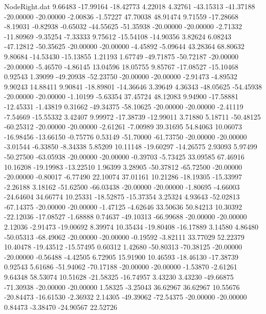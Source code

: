 \begin{filecontents}{NodeRight.dat}
   9.66483  -17.99164  -18.42773     4.22018    4.32761  -43.15313  -41.37188  -20.00000  -20.00000   -2.00836   -1.57227   47.70038   48.91474
   9.71559  -17.28668   -8.19031    -0.82938   -0.65032  -44.55625  -51.35938  -20.00000  -20.00000   -2.71332  -11.80969   -9.35254   -7.33333
   9.75612  -15.54108  -14.90356     3.82624    6.08243  -47.12812  -50.35625  -20.00000  -20.00000   -4.45892   -5.09644   43.28364   68.80632
   9.80684  -14.53430  -15.13855     1.21193    1.67749  -49.71875  -50.72187  -20.00000  -20.00000   -5.46570   -4.86145   13.04596   18.05755
   9.85767  -17.08527  -15.10468     0.92543    1.39099  -49.20938  -52.23750  -20.00000  -20.00000   -2.91473   -4.89532    9.90243   14.88411
   9.90841  -18.89801  -14.36646     3.39649    4.36343  -48.05625  -54.45938  -20.00000  -20.00000   -1.10199   -5.63354   37.45724   48.12083
   9.94900  -17.58881  -12.45331    -1.43819    0.31662  -49.34375  -58.10625  -20.00000  -20.00000   -2.41119   -7.54669  -15.55332    3.42407
   9.99972  -17.38739  -12.99011     3.71880    5.18711  -50.48125  -60.25312  -20.00000  -20.00000   -2.61261   -7.00989   39.31695   54.84063
  10.06073  -16.98456  -13.66150    -0.75776    0.53149  -51.70000  -61.73750  -20.00000  -20.00000   -3.01544   -6.33850   -8.34338    5.85209
  10.11148  -19.60297  -14.26575     2.93093    5.97499  -50.27500  -63.05938  -20.00000  -20.00000   -0.39703   -5.73425   33.09585   67.46916
  10.16208  -19.19983  -13.22510     1.96399    3.28905  -50.37812  -65.72500  -20.00000  -20.00000   -0.80017   -6.77490   22.10074   37.01161
  10.21286  -18.19305  -15.33997    -2.26188    3.18162  -51.62500  -66.03438  -20.00000  -20.00000   -1.80695   -4.66003  -24.64604   34.66774
  10.25331  -18.52875  -15.37354     3.25324    4.93643  -52.02813  -67.14375  -20.00000  -20.00000   -1.47125   -4.62646   33.50636   50.84213
  10.30392  -22.12036  -17.08527    -1.68888    0.74637  -49.10313  -66.99688  -20.00000  -20.00000    2.12036   -2.91473  -19.00692    8.39974
  10.35434  -19.80408  -16.17889     3.14580    4.86480  -50.05313  -68.49062  -20.00000  -20.00000   -0.19592   -3.82111   33.77029   52.22379
  10.40478  -19.43512  -15.57495     0.60312    1.42680  -50.80313  -70.38125  -20.00000  -20.00000   -0.56488   -4.42505    6.72905   15.91900
  10.46593  -18.46130  -17.38739     0.92543    5.61686  -51.94062  -70.17188  -20.00000  -20.00000   -1.53870   -2.61261    9.64348   58.53074
  10.51628  -21.58325  -16.74957     3.43230    3.43230  -49.66875  -71.30938  -20.00000  -20.00000    1.58325   -3.25043   36.62967   36.62967
  10.55676  -20.84473  -16.61530    -2.36932    2.14305  -49.39062  -72.54375  -20.00000  -20.00000    0.84473   -3.38470  -24.90567   22.52726

\end{filecontents}
